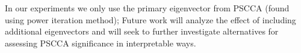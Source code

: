 \documentclass{llncs}
\begin{document}
In our experiments we only use the
primary eigenvector from PSCCA (found using power iteration method);
Future work will analyze the effect of including additional
eigenvectors and will seek to further investigate alternatives for
assessing PSCCA significance in interpretable ways. 







\end{document}
